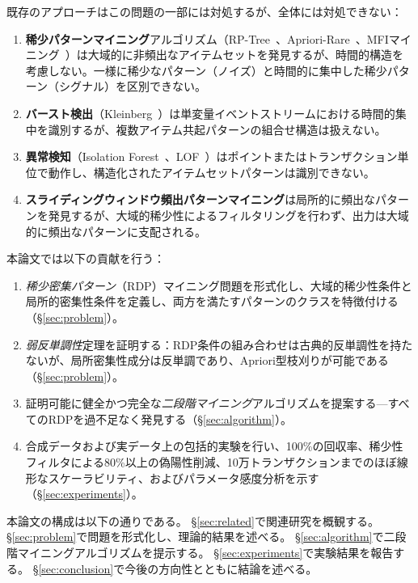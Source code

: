既存のアプローチはこの問題の一部には対処するが、全体には対処できない：

\begin{enumerate}
\item \textbf{稀少パターンマイニング}アルゴリズム（RP-Tree~\cite{tsang2011rptree}、Apriori-Rare~\cite{szathmary2007rare}、MFIマイニング~\cite{haglin2007mfi}）は大域的に非頻出なアイテムセットを発見するが、時間的構造を考慮しない。一様に稀少なパターン（ノイズ）と時間的に集中した稀少パターン（シグナル）を区別できない。

\item \textbf{バースト検出}（Kleinberg~\cite{kleinberg2003bursty}）は単変量イベントストリームにおける時間的集中を識別するが、複数アイテム共起パターンの組合せ構造は扱えない。

\item \textbf{異常検知}（Isolation Forest~\cite{liu2008iforest}、LOF~\cite{breunig2000lof}）はポイントまたはトランザクション単位で動作し、構造化されたアイテムセットパターンは識別できない。

\item \textbf{スライディングウィンドウ頻出パターンマイニング}は局所的に頻出なパターンを発見するが、大域的稀少性によるフィルタリングを行わず、出力は大域的に頻出なパターンに支配される。
\end{enumerate}

本論文では以下の貢献を行う：

\begin{enumerate}
\item \emph{稀少密集パターン}（RDP）マイニング問題を形式化し、大域的稀少性条件と局所的密集性条件を定義し、両方を満たすパターンのクラスを特徴付ける（\S\ref{sec:problem}）。

\item \emph{弱反単調性}定理を証明する：RDP条件の組み合わせは古典的反単調性を持たないが、局所密集性成分は反単調であり、Apriori型枝刈りが可能である（\S\ref{sec:problem}）。

\item 証明可能に健全かつ完全な\emph{二段階マイニング}アルゴリズムを提案する---すべてのRDPを過不足なく発見する（\S\ref{sec:algorithm}）。

\item 合成データおよび実データ上の包括的実験を行い、100\%の回収率、稀少性フィルタによる80\%以上の偽陽性削減、10万トランザクションまでのほぼ線形なスケーラビリティ、およびパラメータ感度分析を示す（\S\ref{sec:experiments}）。
\end{enumerate}

本論文の構成は以下の通りである。
\S\ref{sec:related}で関連研究を概観する。
\S\ref{sec:problem}で問題を形式化し、理論的結果を述べる。
\S\ref{sec:algorithm}で二段階マイニングアルゴリズムを提示する。
\S\ref{sec:experiments}で実験結果を報告する。
\S\ref{sec:conclusion}で今後の方向性とともに結論を述べる。
